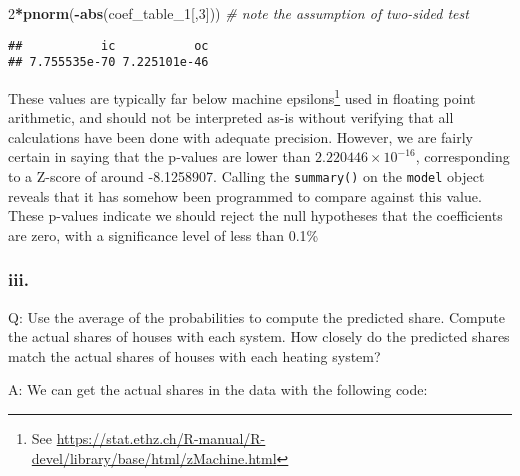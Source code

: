 \documentclass[
]{article}
\newenvironment{Shaded}{\begin{snugshade}}{\end{snugshade}}
\newcommand{\CommentTok}[1]{\textcolor[rgb]{0.56,0.35,0.01}{\textit{#1}}}
\newcommand{\DataTypeTok}[1]{\textcolor[rgb]{0.13,0.29,0.53}{#1}}
\newcommand{\DecValTok}[1]{\textcolor[rgb]{0.00,0.00,0.81}{#1}}
\newcommand{\KeywordTok}[1]{\textcolor[rgb]{0.13,0.29,0.53}{\textbf{#1}}}
\newcommand{\NormalTok}[1]{#1}
\newcommand{\OperatorTok}[1]{\textcolor[rgb]{0.81,0.36,0.00}{\textbf{#1}}}
\newcommand{\StringTok}[1]{\textcolor[rgb]{0.31,0.60,0.02}{#1}}
\begin{document}
\begin{Shaded}
\begin{Highlighting}[]
\DecValTok{2}\OperatorTok{*}\KeywordTok{pnorm}\NormalTok{(}\OperatorTok{-}\KeywordTok{abs}\NormalTok{(coef_table_}\DecValTok{1}\NormalTok{[,}\DecValTok{3}\NormalTok{]))}
\CommentTok{# note the assumption of two-sided test}
\end{Highlighting}
\end{Shaded}

\begin{verbatim}
##           ic           oc 
## 7.755535e-70 7.225101e-46
\end{verbatim}

These values are typically far below machine epsilons\footnote{See
  \url{https://stat.ethz.ch/R-manual/R-devel/library/base/html/zMachine.html}}
used in floating point arithmetic, and should not be interpreted as-is
without verifying that all calculations have been done with adequate
precision. However, we are fairly certain in saying that the p-values
are lower than \(\ensuremath{2.220446\times 10^{-16}}\), corresponding
to a Z-score of around -8.1258907. Calling the \texttt{summary()} on the
\texttt{model} object reveals that it has somehow been programmed to
compare against this value. These p-values indicate we should reject the
null hypotheses that the coefficients are zero, with a significance
level of less than 0.1\%

\hypertarget{iii.}{%
\subsubsection{iii.}\label{iii.}}

Q: Use the average of the probabilities to compute the predicted share.
Compute the actual shares of houses with each system. How closely do the
predicted shares match the actual shares of houses with each heating
system?

A: We can get the actual shares in the data with the following code:

\begin{Shaded}
\end{Shaded}
\end{document}
